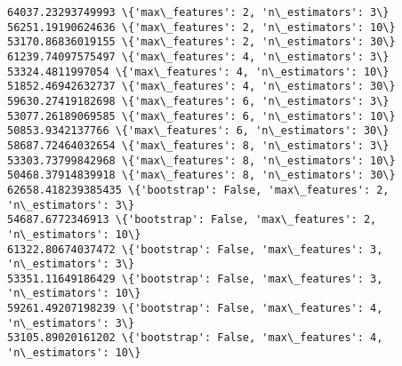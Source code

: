 \documentclass[11pt]{article}
\begin{document}
    \begin{Verbatim}[commandchars=\\\{\}]
64037.23293749993 \{'max\_features': 2, 'n\_estimators': 3\}
56251.19190624636 \{'max\_features': 2, 'n\_estimators': 10\}
53170.86836019155 \{'max\_features': 2, 'n\_estimators': 30\}
61239.74097575497 \{'max\_features': 4, 'n\_estimators': 3\}
53324.4811997054 \{'max\_features': 4, 'n\_estimators': 10\}
51852.46942632737 \{'max\_features': 4, 'n\_estimators': 30\}
59630.27419182698 \{'max\_features': 6, 'n\_estimators': 3\}
53077.26189069585 \{'max\_features': 6, 'n\_estimators': 10\}
50853.9342137766 \{'max\_features': 6, 'n\_estimators': 30\}
58687.72464032654 \{'max\_features': 8, 'n\_estimators': 3\}
53303.73799842968 \{'max\_features': 8, 'n\_estimators': 10\}
50468.37914839918 \{'max\_features': 8, 'n\_estimators': 30\}
62658.418239385435 \{'bootstrap': False, 'max\_features': 2, 'n\_estimators': 3\}
54687.6772346913 \{'bootstrap': False, 'max\_features': 2, 'n\_estimators': 10\}
61322.80674037472 \{'bootstrap': False, 'max\_features': 3, 'n\_estimators': 3\}
53351.11649186429 \{'bootstrap': False, 'max\_features': 3, 'n\_estimators': 10\}
59261.49207198239 \{'bootstrap': False, 'max\_features': 4, 'n\_estimators': 3\}
53105.89020161202 \{'bootstrap': False, 'max\_features': 4, 'n\_estimators': 10\}

    \end{Verbatim}
\end{document}
